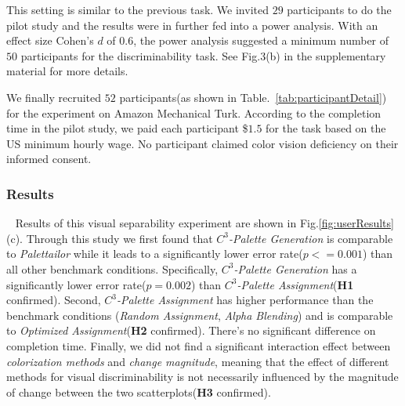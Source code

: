 {\vspace{.3em}
This setting is similar to the previous task. We invited $29$ participants to do the pilot study and the results were in further fed into a power analysis. With an effect size Cohen's $d$ of $0.6$, the power analysis suggested a minimum number of $50$ participants for the discriminability task.  See Fig.3(b) in the supplementary material for more details.

\vspace{.3em}
We finally recruited $52$ participants(as shown in Table.~\ref{tab:participantDetail}) for the experiment on Amazon Mechanical Turk.
According to the completion time in the pilot study, we paid each participant \$$1.5$ for the task based on the US minimum hourly wage.
No participant claimed color vision deficiency on their informed consent.

\subsubsection{Results}
\
\newline
Results of this visual separability experiment are shown in Fig.\ref{fig:userResults} (c).
Through this study we first found that \emph{$C^3$-Palette Generation} is comparable to \emph{Palettailor} while it leads to a significantly lower error rate(\emph{$p<=0.001$}) than all other benchmark conditions. Specifically, \emph{$C^3$-Palette Generation} has a significantly lower error rate(\emph{$p=0.002$}) than \emph{$C^3$-Palette Assignment}(\textbf{H1} confirmed).
Second, \emph{$C^3$-Palette Assignment} has higher performance than the benchmark conditions (\emph{Random Assignment}, \emph{Alpha Blending}) and is comparable to \emph{Optimized Assignment}(\textbf{H2} confirmed). There's no significant difference on completion time.
Finally, we did not find a significant interaction effect between \emph{colorization methods} and \emph{change magnitude}, meaning that the effect of different methods for visual discriminability is not
necessarily influenced by the magnitude of change between the two scatterplots(\textbf{H3} confirmed).

}
